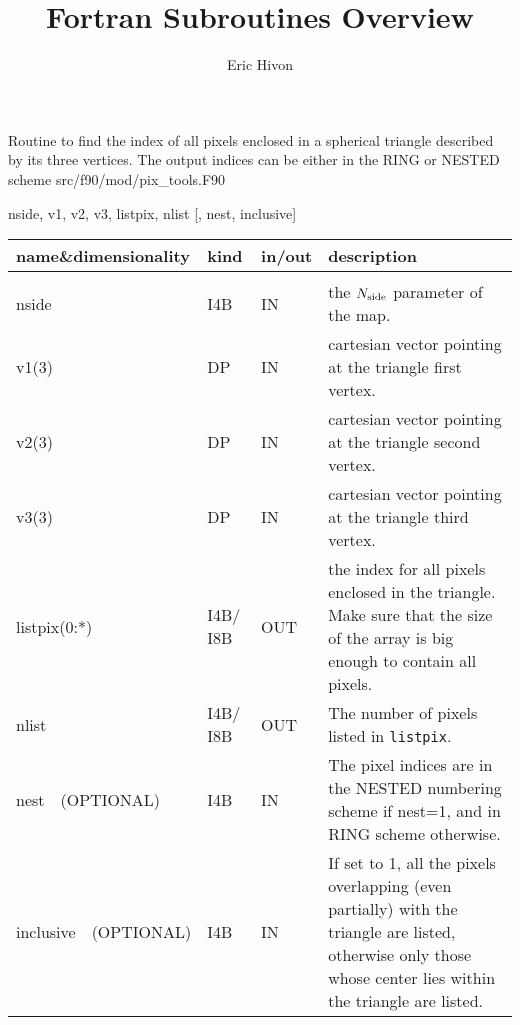 
\sloppy


\title{\healpix Fortran Subroutines Overview}
 \section[query\_triangle]{ }
\label{sub:query_triangle}
\author{Eric Hivon}

\begin{facility}
{Routine to find the index of all pixels enclosed in a spherical triangle described by its three vertices. The output indices can be either in the RING or NESTED scheme} 
{src/f90/mod/pix\_tools.F90}
\end{facility}

\begin{f90format}
{nside, v1, v2, v3, listpix, nlist [, nest, inclusive]}
\end{f90format}

\begin{arguments}
{
\begin{tabular}{p{0.28\hsize} p{0.05\hsize} p{0.1\hsize} p{0.47\hsize}} \hline 
\textbf{name\&dimensionality} & \textbf{kind} & \textbf{in/out} & \textbf{description} \\ \hline
                   &   &   &                           \\ %
nside & I4B & IN & the ${N_{\rm side}}$ parameter of the map. \\
v1(3) & DP & IN & cartesian vector pointing at the triangle first vertex. \\
v2(3) & DP & IN & cartesian vector pointing at the triangle second vertex. \\
v3(3) & DP & IN & cartesian vector pointing at the triangle third vertex. \\
listpix(0:*) & I4B/ I8B & OUT & the index for all pixels enclosed in the triangle. Make sure that the size of the array is big enough to contain all pixels. \\ 
nlist & I4B/ I8B & OUT & The number of pixels listed in {\tt listpix}. \\
nest\ \ (OPTIONAL) & I4B & IN &  The pixel indices are in the NESTED numbering scheme if nest=1, and in RING scheme otherwise. \\
inclusive\ \ (OPTIONAL) & I4B & IN & If set to 1, all the pixels overlapping
                   (even partially)
                   with the triangle are listed, otherwise only those whose
                   center lies within the triangle are listed. \\
\end{tabular}
}
\end{arguments}

